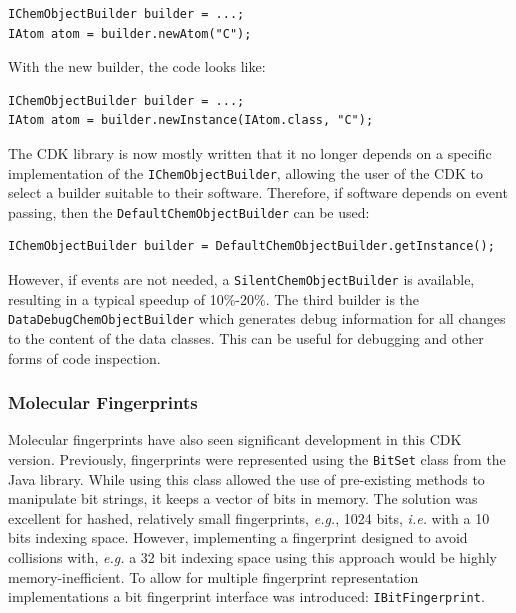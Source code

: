 \documentclass[10pt]{bmcart}
\begin{document}
\vspace{0.2cm}
\begin{verbatim}
IChemObjectBuilder builder = ...;
IAtom atom = builder.newAtom("C");
\end{verbatim}
\vspace{0.2cm}

With the new builder, the code looks like:

\vspace{0.2cm}
\begin{verbatim}
IChemObjectBuilder builder = ...;
IAtom atom = builder.newInstance(IAtom.class, "C");
\end{verbatim}
\vspace{0.2cm}

The CDK library is now mostly written that it no longer depends on a specific
implementation of the \texttt{IChemObjectBuilder}, allowing the user of the
CDK to select a builder suitable to their software. Therefore, if software
depends on event passing, then the \texttt{DefaultChemObjectBuilder} can be
used:

\vspace{0.2cm}
\begin{verbatim}
IChemObjectBuilder builder = DefaultChemObjectBuilder.getInstance();
\end{verbatim}
\vspace{0.2cm}

However, if events are not needed, a \texttt{SilentChemObjectBuilder} is
available, resulting in a typical speedup of 10\%-20\%.  The third builder
is the \texttt{DataDebugChemObjectBuilder} which generates debug
information for all changes to the content of the data classes. This
can be useful for debugging and other forms of code inspection.

\subsubsection*{Molecular Fingerprints}
Molecular fingerprints have also seen significant development in this CDK version.
Previously, fingerprints were represented using the \texttt{BitSet} class from
the Java library. While using this class
allowed the use of pre-existing methods to manipulate bit strings, it
keeps a vector of bits in memory. The solution was excellent for
hashed, relatively small fingerprints, \textit{e.g.}, 1024 bits,
\textit{i.e.} with a 10 bits indexing space. However, implementing a
fingerprint designed to avoid collisions with, \textit{e.g.} a 32 bit
indexing space using this approach would be highly
memory-inefficient. To allow for multiple fingerprint representation
implementations a bit fingerprint interface was introduced:
\texttt{IBitFingerprint}.
\end{document}
